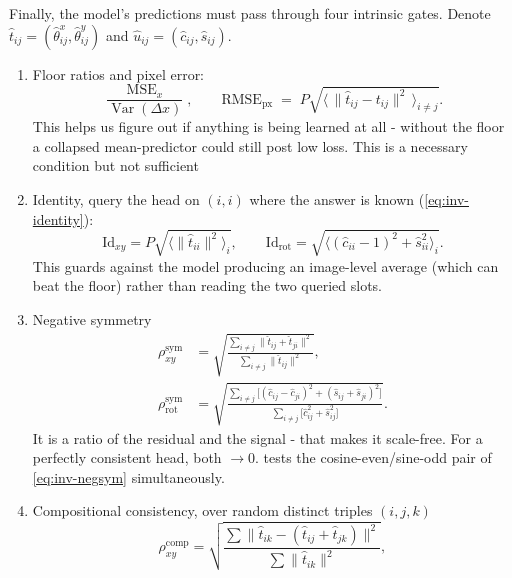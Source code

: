 \documentclass[final_report.tex]{subfiles}
\begin{document}
Finally, the model's predictions must pass through four intrinsic gates. Denote $\hat t_{ij} = (\hat\theta^x_{ij}, \hat\theta^y_{ij})$ and
$\hat u_{ij} = (\hat c_{ij}, \hat s_{ij})$.

\begin{enumerate}
\item Floor ratios and pixel error:
\begin{equation}\label{eq:metric-floor-ratio}
  \frac{\operatorname{MSE}_x}{\operatorname{Var}(\Delta x)},
  \qquad
  \mathrm{RMSE}_{\mathrm{px}} \;=\; P\sqrt{\bigl\langle\, \lVert \hat t_{ij} - t_{ij} \rVert^2 \,\bigr\rangle_{i \neq j}} .
\end{equation}
This helps us figure out if anything is being learned at all - without the floor a collapsed mean-predictor could still post low loss. This is a necessary condition but not sufficient
\item Identity, query the head on $(i,i)$ where the answer is known (\cref{eq:inv-identity}):
\begin{equation}\label{eq:metric-identity}
  \mathrm{Id}_{xy} = P\sqrt{\bigl\langle \lVert \hat t_{ii} \rVert^2 \bigr\rangle_i},
  \qquad
  \mathrm{Id}_{\mathrm{rot}} = \sqrt{\bigl\langle (\hat c_{ii} - 1)^2 + \hat s_{ii}^2 \bigr\rangle_i} .
\end{equation}
This guards against the model producing an image-level average (which can beat the floor) rather than reading the two queried slots. 
\item Negative symmetry
\begin{align}
  \rho^{\mathrm{sym}}_{xy}
    &= \sqrt{\frac{\sum_{i \neq j} \lVert \hat t_{ij} + \hat t_{ji} \rVert^2}
                  {\sum_{i \neq j} \lVert \hat t_{ij} \rVert^2}},
  \label{eq:metric-negsym-xy}\\
  \rho^{\mathrm{sym}}_{\mathrm{rot}}
    &= \sqrt{\frac{\sum_{i \neq j} \bigl[(\hat c_{ij} - \hat c_{ji})^2 + (\hat s_{ij} + \hat s_{ji})^2\bigr]}
                  {\sum_{i \neq j} \bigl[\hat c_{ij}^2 + \hat s_{ij}^2\bigr]}} .
  \label{eq:metric-negsym-rot}
\end{align}
It is a ratio of the residual and the signal - that makes it scale-free. For a perfectly consistent head, both $\to 0$.  tests the cosine-even/sine-odd pair of \cref{eq:inv-negsym} simultaneously.
\item Compositional consistency, over random distinct triples $(i,j,k)$
\begin{equation}\label{eq:metric-comp-xy}
  \rho^{\mathrm{comp}}_{xy}
  = \sqrt{\frac{\sum \lVert \hat t_{ik} - (\hat t_{ij} + \hat t_{jk}) \rVert^2}
               {\sum \lVert \hat t_{ik} \rVert^2}},
\end{equation}


\end{enumerate}
\end{document}
